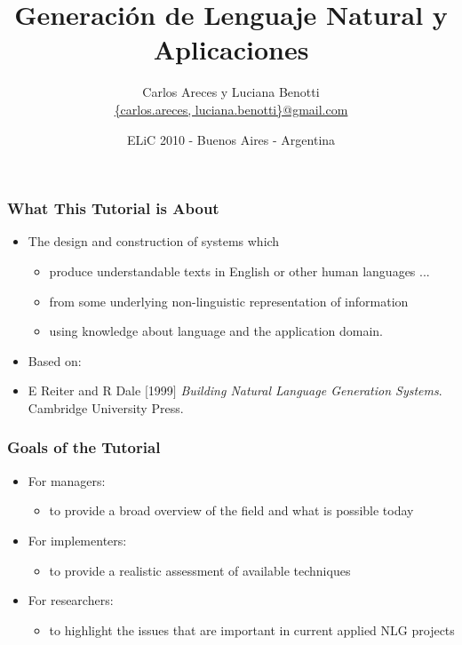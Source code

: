 \documentclass[compress,color=usenames]{beamer}
\title[GLN y Aplicaciones]{\Huge Generaci\'on de Lenguaje Natural y Aplicaciones}
\author[Areces \& Benotti]{
 Carlos Areces y Luciana Benotti\\[1ex]
\normalsize \url{{carlos.areces, luciana.benotti}@gmail.com}}
\institute[INRIA / UNC]{
INRIA Nancy Grand Est, Nancy, France\\
Universidad Nacional de C\'ordoba, C\'ordoba, Argentina}
\date{ELiC 2010 - Buenos Aires - Argentina}
\begin{document}
\beamerdefaultoverlayspecification{}


\begin{frame}[plain]
 \titlepage
\end{frame}

\begin{frame}
\frametitle{What This Tutorial is About}

\label{f0}
\begin{itemize}
\item { {The design and construction of systems which}}
\begin{itemize}
\item produce understandable texts in English or other human languages ...
\item from some underlying non-linguistic representation of information 
\item using knowledge about language and the application domain.
\end{itemize}
\item { {Based on:}}
\item { { E Reiter and R Dale \mbox{$[$}1999\mbox{$]$} \textit{Building Natural Language Generation Systems}. Cambridge University Press.}}
\end{itemize}

\end{frame}

\begin{frame}
\frametitle{Goals of the Tutorial}

\label{f2}
\begin{itemize}
\item { {For managers:}}
\begin{itemize}
\item to provide a broad overview of the field and what is possible today
\end{itemize}
\item { {For implementers:}}
\begin{itemize}
\item to provide a realistic assessment of available techniques
\end{itemize}
\item { {For researchers:}}
\begin{itemize}
\item to highlight the issues that are important in current applied NLG projects
\end{itemize}
\end{itemize}



\end{frame}
\end{document}
